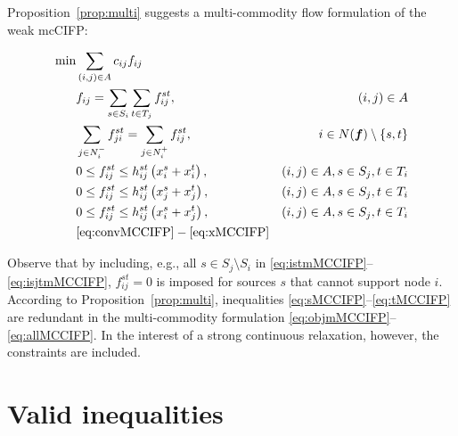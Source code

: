 \documentclass[pdflatex,sn-mathphys-num]{sn-jnl}%
\theoremstyle{thmstyleone}%
\begin{document}
Proposition~\ref{prop:multi} suggests a multi-commodity flow formulation of the weak mcCIFP:

\begin{eqnarray}
\min & \sum_{(i,j)\in A}c_{ij}f_{ij} \label{eq:objmMCCIFP} \\
     & f_{ij} = \sum_{s\in S_i}\sum_{t\in T_j}f_{ij}^{st}, & (i,j)\in A \label{eq:fmMCCIFP} \\
     & \sum_{j\in N_i^-}f_{ji}^{st} = \sum_{j\in N_i^+}f_{ij}^{st}, & i\in N(\boldsymbol{f})\setminus\{s,t\} \label{eq:stmMCCIFP} \\
     & 0\leq f_{ij}^{st}\leq h_{ij}^{st}\left(x_i^s+x_i^t\right), & (i,j)\in A, s\in S_j, t\in T_i \label{eq:istmMCCIFP} \\
     & 0\leq f_{ij}^{st}\leq h_{ij}^{st}\left(x_j^s+x_j^t\right), & (i,j)\in A, s\in S_j, t\in T_i \label{eq:jtsmMCCIFP} \\
     & 0\leq f_{ij}^{st}\leq h_{ij}^{st}\left(x_i^s+x_j^t\right), & (i,j)\in A, s\in S_j, t\in T_i \label{eq:isjtmMCCIFP} \\
     & \eqref{eq:convMCCIFP}-\eqref{eq:xMCCIFP}\label{eq:mMCCIFP} \label{eq:allMCCIFP}
\end{eqnarray}

Observe that by including, e.g., all $s\in S_j\setminus S_i$ in \eqref{eq:istmMCCIFP}--\eqref{eq:isjtmMCCIFP}, $f_{ij}^{st}=0$ is imposed for sources $s$ that cannot support node $i$.
According to Proposition~\ref{prop:multi}, inequalities \eqref{eq:sMCCIFP}--\eqref{eq:tMCCIFP} are redundant in the multi-commodity formulation \eqref{eq:objmMCCIFP}--\eqref{eq:allMCCIFP}.
In the interest of a strong continuous relaxation, however, the constraints are included.

\section{Valid inequalities} \label{sec:vi}
\end{document}
